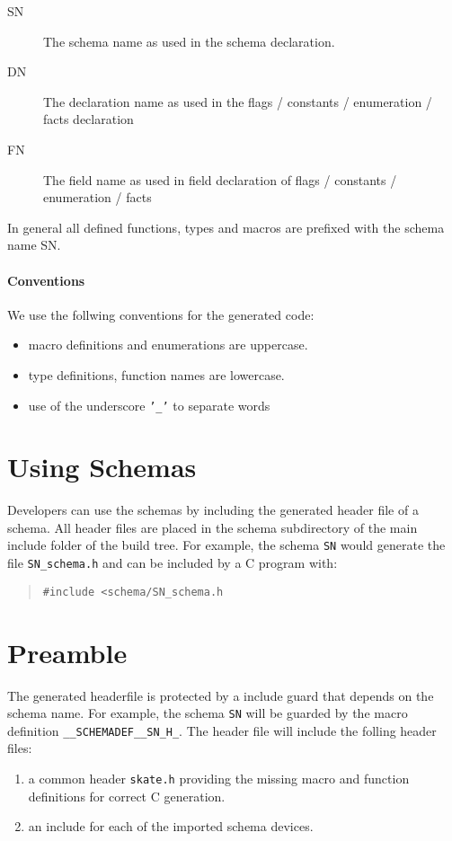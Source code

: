\documentclass[a4paper,11pt,twoside]{report}
\begin{document}
{{\begin{description}
  \item[SN] The schema name as used in the schema declaration.
  \item[DN] The declaration name as used in the flags / constants / 
            enumeration / facts declaration
  \item[FN] The field name as used in field declaration of flags / constants / 
            enumeration / facts
\end{description}

In general all defined functions, types and macros are prefixed with the schema
name SN.

\paragraph{Conventions}
We use the follwing conventions for the generated code:
\begin{itemize}
  \item macro definitions and enumerations are uppercase.
  \item type definitions, function names are lowercase.
  \item use of the underscore \texttt{'\_'} to separate words
\end{itemize}


\section{Using Schemas}

Developers can use the schemas by including the generated header file of a 
schema. All header files are placed in the schema subdirectory of the main 
include folder of the build tree. For example, the 
schema \texttt{SN} would generate the file \texttt{SN\_schema.h} and can 
be included by a C program with:
\begin{quote}
\texttt{\#include <schema/SN\_schema.h}
\end{quote}

\section{Preamble}

The generated headerfile is protected by a include guard that depends on the
schema name. For example, the schema \texttt{SN} will be guarded by the
macro definition \texttt{\_\_SCHEMADEF\_\_SN\_H\_}. The header file will 
include the folling header files:
\begin{enumerate}
  \item a common header \texttt{skate.h} providing the missing macro and 
        function definitions for correct C generation.
  \item an include for each of the imported schema devices.
\end{enumerate}

}}
\end{document}
